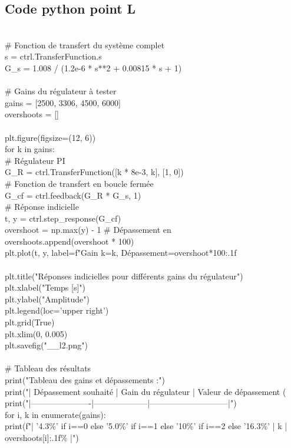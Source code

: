 \documentclass[letterpaper,12pt]{article}
\begin{document}
\subsection{Code python point L}
\\# Fonction de transfert du système complet
\\s = ctrl.TransferFunction.s
\\G\_s = 1.008 / (1.2e-6 * s**2 + 0.00815 * s + 1)
\\
\\# Gains du régulateur à tester
\\gains = [2500, 3306, 4500, 6000]
\\overshoots = []
\\
\\plt.figure(figsize=(12, 6))
\\for k in gains:
\\    # Régulateur PI
\\    G\_R = ctrl.TransferFunction([k * 8e-3, k], [1, 0])
\\    # Fonction de transfert en boucle fermée
\\    G\_cf = ctrl.feedback(G\_R * G\_s, 1)
\\    # Réponse indicielle
\\    t, y = ctrl.step\_response(G\_cf)
\\    overshoot = np.max(y) - 1  # Dépassement en %
\\    overshoots.append(overshoot * 100)
\\    plt.plot(t, y, label=f"Gain k={k}, Dépassement={overshoot*100:.1f}%
\\
\\plt.title("Réponses indicielles pour différents gains du régulateur")
\\plt.xlabel("Temps [s]")
\\plt.ylabel("Amplitude")
\\plt.legend(loc='upper right')
\\plt.grid(True)
\\plt.xlim(0, 0.005)
\\plt.savefig("\_\_l2.png")
\\
\\# Tableau des résultats
\\print("Tableau des gains et dépassements :")
\\print("| Dépassement souhaité | Gain du régulateur | Valeur de dépassement (%
\\print("|----------------------|--------------------|-----------------------------|")
\\for i, k in enumerate(gains):
\\    print(f"| {'4.3\%' if i==0 else '5.0\%' if i==1 else '10\%' if i==2 else '16.3\%'} | {k} | {overshoots[i]:.1f}\% |")
\end{document}

